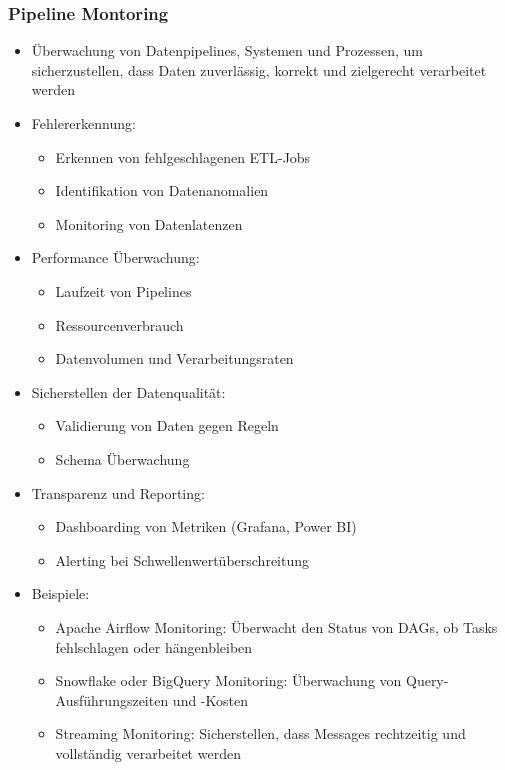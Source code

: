 \documentclass[11pt]{scrartcl}
\begin{document}
\subsubsection*{Pipeline Montoring}
\begin{itemize}
	\item Überwachung von Datenpipelines, Systemen und Prozessen, um sicherzustellen, dass Daten zuverlässig, korrekt und zielgerecht verarbeitet werden
	\item Fehlererkennung:
	\begin{itemize}
		\item Erkennen von fehlgeschlagenen ETL-Jobs
		\item Identifikation von Datenanomalien
		\item Monitoring von Datenlatenzen
	\end{itemize}
	\item Performance Überwachung:
	\begin{itemize}
		\item Laufzeit von Pipelines
		\item Ressourcenverbrauch
		\item Datenvolumen und Verarbeitungsraten
	\end{itemize}
	\item Sicherstellen der Datenqualität:
	\begin{itemize}
		\item Validierung von Daten gegen Regeln
		\item Schema Überwachung
	\end{itemize}
	\item Transparenz und Reporting:
	\begin{itemize}
		\item Dashboarding von Metriken (Grafana, Power BI)
		\item Alerting bei Schwellenwertüberschreitung
	\end{itemize}
	\item Beispiele:
	\begin{itemize}
		\item Apache Airflow Monitoring: Überwacht den Status von DAGs, ob Tasks fehlschlagen oder hängenbleiben
		\item Snowflake oder BigQuery Monitoring: Überwachung von Query-Ausführungszeiten und -Kosten
		\item Streaming Monitoring: Sicherstellen, dass Messages rechtzeitig und vollständig verarbeitet werden
	\end{itemize}
\end{itemize}
\end{document}
